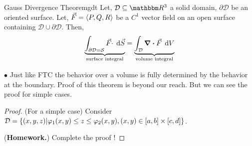 \documentclass[../Analysis-3]{subfiles}
\begin{document}
\begin{Thm}{Gauss Divergence Theorem}{gdt}
    Let, $\mathcal{D} \subseteq \R^3$ a solid domain, $\partial{\mathcal{D}}$ be an oriented surface. Let,  $\vec{F} = \left\langle {P}, {Q,R} \right\rangle$ be a $C^1$ vector field on an open surface containing $\mathcal{D} \cup \partial{\mathcal{D}}$. Then,
    \[
        \underbrace{\int_{\partial{\mathcal{D}} = \mathcal{S}} {\vec{F}\cdot} \hspace{0.1cm} \dd {\vec{S}}}_\text{surface integral} = \underbrace{\int_{\mathcal{D}} {\div \vec{F}} \hspace{0.1cm} \dd {V}}_\text{volume integral}
    \]
\end{Thm}

$ \bullet $ Just like FTC the behavior over a volume is fully determined by the behavior at the boundary. Proof of this theorem is beyond our reach. But we can see the proof for simple cases.

\vspace{0.2cm}

\begin{proof}
    (For a simple case) Consider $\mathcal{D} = \qty{(x,y,z) | \varphi_1(x,y) \le z \le \varphi_2(x,y), (x,y) \in [a,b]\times [c,d]}$.

    (\textbf{Homework.}) Complete the proof !
\end{proof}

\end{document}
